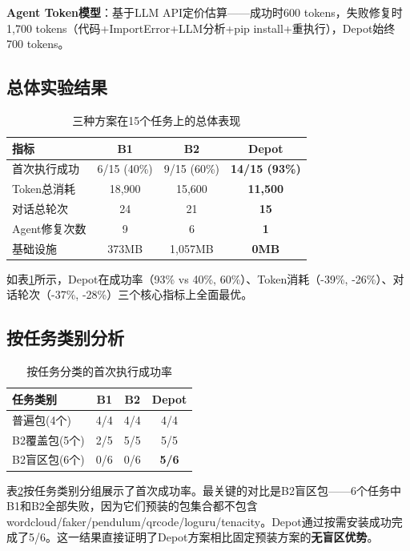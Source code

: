 \documentclass[10pt]{ctexart}
\begin{document}
\textbf{Agent Token模型}：基于LLM API定价\cite{openai2024pricing,anthropic2024pricing}估算——成功时600 tokens，失败修复时1,700 tokens（代码+ImportError+LLM分析+pip install+重执行），Depot始终700 tokens。

\subsection{总体实验结果}

\begin{table}[H]
\centering
\caption{三种方案在15个任务上的总体表现}
\label{tab:overall}
\small
\begin{tabular}{@{}l c c c@{}}
\toprule
指标 & B1 & B2 & \textbf{Depot} \\
\midrule
首次执行成功 & 6/15 (40\%) & 9/15 (60\%) & \textbf{14/15 (93\%)} \\
Token总消耗 & 18,900 & 15,600 & \textbf{11,500} \\
对话总轮次 & 24 & 21 & \textbf{15} \\
Agent修复次数 & 9 & 6 & \textbf{1} \\
基础设施 & 373MB & 1,057MB & \textbf{0MB} \\
\bottomrule
\end{tabular}
\end{table}

如表\ref{tab:overall}所示，Depot在成功率（93\% vs 40\%, 60\%）、Token消耗（-39\%, -26\%）、对话轮次（-37\%, -28\%）三个核心指标上全面最优。

\subsection{按任务类别分析}

\begin{table}[H]
\centering
\caption{按任务分类的首次执行成功率}
\label{tab:category}
\small
\begin{tabular}{@{}l c c c@{}}
\toprule
任务类别 & B1 & B2 & \textbf{Depot} \\
\midrule
普遍包(4个) & 4/4 & 4/4 & 4/4 \\
B2覆盖包(5个) & 2/5 & 5/5 & 5/5 \\
B2盲区包(6个) & 0/6 & 0/6 & \textbf{5/6} \\
\bottomrule
\end{tabular}
\end{table}

表\ref{tab:category}按任务类别分组展示了首次成功率。最关键的对比是B2盲区包——6个任务中B1和B2全部失败，因为它们预装的包集合都不包含wordcloud/faker/pendulum/qrcode/loguru/tenacity。Depot通过按需安装成功完成了5/6。这一结果直接证明了Depot方案相比固定预装方案的\textbf{无盲区优势}。
\end{document}

